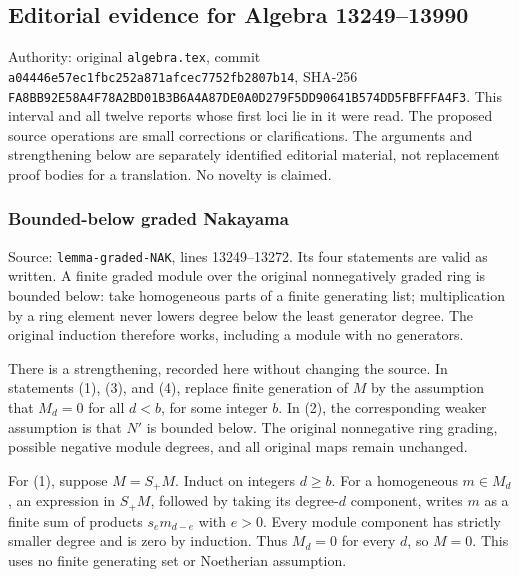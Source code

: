 \subsection{Editorial evidence for Algebra 13249--13990}\label{algebra-proof-002-editorial-evidence-for-algebra-1324913990}

Authority: original \texttt{algebra.tex}, commit \texttt{a044\allowbreak{}46e5\allowbreak{}7ec1\allowbreak{}fbc2\allowbreak{}52a8\allowbreak{}71af\allowbreak{}cec7\allowbreak{}752f\allowbreak{}b280\allowbreak{}7b14}, SHA-256 \texttt{FA8B\allowbreak{}B92E\allowbreak{}58A4\allowbreak{}F78A\allowbreak{}2BD0\allowbreak{}1B3B\allowbreak{}6A4A\allowbreak{}87DE\allowbreak{}0A0D\allowbreak{}279F\allowbreak{}5DD9\allowbreak{}0641\allowbreak{}B574\allowbreak{}DD5F\allowbreak{}BFFF\allowbreak{}A4F3}. This interval and all twelve reports whose first loci lie in it were read. The proposed source operations are small corrections or clarifications. The arguments and strengthening below are separately identified editorial material, not replacement proof bodies for a translation. No novelty is claimed.

\subsubsection{Bounded-below graded Nakayama}\label{algebra-proof-002-bounded-below-graded-nakayama}

Source: \texttt{lemma-graded-NAK}, lines 13249--13272. Its four statements are valid as written. A finite graded module over the original nonnegatively graded ring is bounded below: take homogeneous parts of a finite generating list; multiplication by a ring element never lowers degree below the least generator degree. The original induction therefore works, including a module with no generators.

There is a strengthening, recorded here without changing the source. In statements (1), (3), and (4), replace finite generation of \(M\) by the assumption that \(M_d=0\) for all \(d<b\), for some integer \(b\). In (2), the corresponding weaker assumption is that \(N'\) is bounded below. The original nonnegative ring grading, possible negative module degrees, and all original maps remain unchanged.

For (1), suppose \(M=S_+M\). Induct on integers \(d\geq b\). For a homogeneous \(m\in M_d\), an expression in \(S_+M\), followed by taking its degree-\(d\) component, writes \(m\) as a finite sum of products \(s_e m_{d-e}\) with \(e>0\). Every module component has strictly smaller degree and is zero by induction. Thus \(M_d=0\) for every \(d\), so \(M=0\). This uses no finite generating set or Noetherian assumption.

